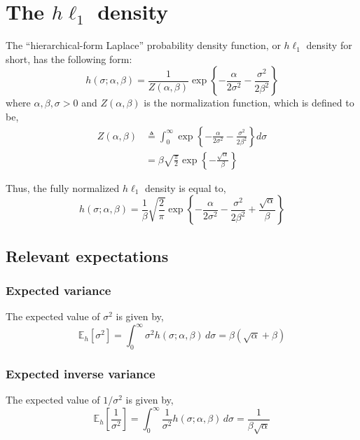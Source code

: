 \documentclass{article}
\newcommand{\E}[2]{\mathbb{E}_{#2}\left[ #1 \right]}
\begin{document}
\section{The $h\ell_1$ density}
\label{s:hprior}
The ``hierarchical-form Laplace'' probability density function,
or $h\ell_1$ density for short, has the following form:
\begin{equation}
h(\sigma; \alpha, \beta) =
 \frac{1}{Z(\alpha, \beta)}
 \exp\left\{
  -\frac{\alpha}{2 \sigma^2}
  -\frac{\sigma^2}{2 \beta^2}
 \right\}
\label{eq:hprior}
\end{equation}
where $\alpha, \beta, \sigma > 0$ and $Z(\alpha, \beta)$ is the
normalization function, which is defined to be,
\begin{equation}
\begin{aligned}
Z(\alpha, \beta) &\triangleq
 \int_0^\infty \exp\left\{
  -\frac{\alpha}{2 \sigma^2}
  -\frac{\sigma^2}{2 \beta^2}
 \right\} d\sigma
\\ &=
 \beta \sqrt{\frac{\pi}{2}}
 \exp\left\{ -\frac{\sqrt{\alpha}}{\beta} \right\}
\end{aligned}
\label{eq:hprior_z}
\end{equation}

Thus, the fully normalized $h\ell_1$ density is equal to,
\begin{equation}
h(\sigma; \alpha, \beta) =
 \frac{1}{\beta} \sqrt{\frac{2}{\pi}}
 \exp\left\{
  -\frac{\alpha}{2 \sigma^2}
  -\frac{\sigma^2}{2 \beta^2}
  +\frac{\sqrt{\alpha}}{\beta}
 \right\}
\label{eq:hprior_norm}
\end{equation}

\subsection{Relevant expectations}
\subsubsection{Expected variance}
The expected value of $\sigma^2$ is given by,
\begin{equation}
\E{\sigma^2}{h} =
 \int_0^\infty \sigma^2 h(\sigma; \alpha, \beta) \, d\sigma =
 \beta (\sqrt{\alpha} + \beta)
\label{eq:expect_s2}
\end{equation}

\subsubsection{Expected inverse variance}
The expected value of $1 / \sigma^2$ is given by,
\begin{equation}
\E{\frac{1}{\sigma^2}}{h} =
 \int_0^\infty \frac{1}{\sigma^2} h(\sigma; \alpha, \beta) \, d\sigma =
 \frac{1}{\beta \sqrt{\alpha}}
\label{eq:expect_s2_inv}
\end{equation}
\end{document}
